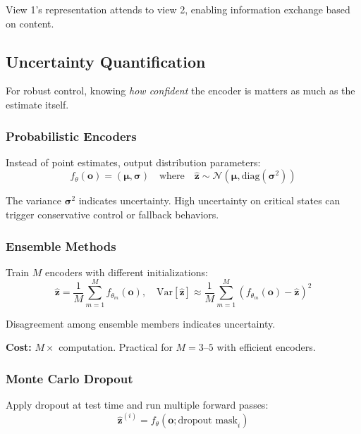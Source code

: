 View 1's representation attends to view 2, enabling information exchange based on content.

\subsection{Uncertainty Quantification}

For robust control, knowing \textit{how confident} the encoder is matters as much as the estimate itself.

\subsubsection{Probabilistic Encoders}

Instead of point estimates, output distribution parameters:
\begin{equation}
f_\theta(\mathbf{o}) = (\boldsymbol{\mu}, \boldsymbol{\sigma}) \quad \text{where} \quad \hat{\mathbf{z}} \sim \mathcal{N}(\boldsymbol{\mu}, \text{diag}(\boldsymbol{\sigma}^2))
\label{eq:probabilistic_encoder}
\end{equation}

The variance $\boldsymbol{\sigma}^2$ indicates uncertainty. High uncertainty on critical states can trigger conservative control or fallback behaviors.

\subsubsection{Ensemble Methods}

Train $M$ encoders with different initializations:
\begin{equation}
\hat{\mathbf{z}} = \frac{1}{M} \sum_{m=1}^{M} f_{\theta_m}(\mathbf{o}), \quad \text{Var}[\hat{\mathbf{z}}] \approx \frac{1}{M} \sum_{m=1}^{M} (f_{\theta_m}(\mathbf{o}) - \hat{\mathbf{z}})^2
\label{eq:ensemble_uncertainty}
\end{equation}

Disagreement among ensemble members indicates uncertainty.

\textbf{Cost:} $M\times$ computation. Practical for $M = 3$--$5$ with efficient encoders.

\subsubsection{Monte Carlo Dropout}

Apply dropout at test time and run multiple forward passes:
\begin{equation}
\hat{\mathbf{z}}^{(i)} = f_\theta(\mathbf{o}; \text{dropout mask}_i)
\label{eq:mc_dropout}
\end{equation}

